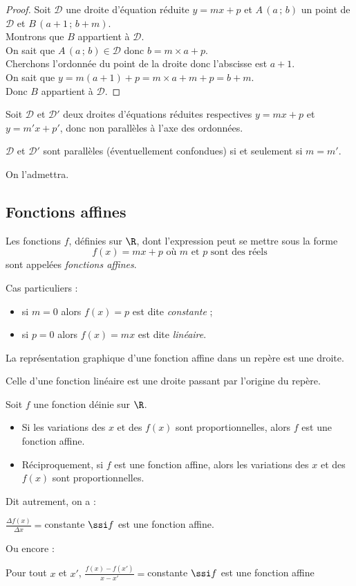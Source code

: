 \begin{proof}
Soit $\mathcal{D}$ une droite d'équation réduite $y=mx+p$ et $A\,(a\,;\,b)$ un point de $\mathcal{D}$ et $B\,(a+1\,;\,b+m)$.\\
Montrons que $B$ appartient à $\mathcal{D}$.\\
On sait que $A\,(a\,;\,b)\in\mathcal{D}$ donc $b=m\times a + p$.\\
Cherchons l'ordonn\'ee du point de la droite donc l'abscisse est $a+1$.\\
On sait que $y=m(a+1)+p=m\times a + m + p = b+m$.\\
Donc $B$ appartient à $\mathcal{D}$.
\end{proof}
\begin{prop}
Soit $\mathcal{D}$ et $\mathcal{D}'$ deux droites d'équations réduites respectives $y=mx+p$ et $y=m'x+p'$, donc non parallèles à l'axe des ordonnées.

$\mathcal{D}$ et $\mathcal{D}'$ sont parallèles (éventuellement confondues) si et seulement si $m=m'$.
\end{prop}

On l'admettra.

\subsection{Fonctions affines}
\begin{definition}
Les fonctions $f$, définies sur $\R$, dont l'expression peut se mettre sous la forme \[f(x)=mx+p \text{ où $m$ et $p$ sont des réels}\] sont appelées \emph{fonctions affines}.

Cas particuliers :
\begin{itemize}
	\item si $m=0$ alors $f(x)=p$ est dite \emph{constante} ;
	\item si $p=0$ alors $f(x)=mx$ est dite \emph{linéaire}.
\end{itemize}
\end{definition}

\begin{prop}
La représentation graphique d'une fonction affine dans un repère est une droite.

Celle d'une fonction linéaire est une droite passant par l'origine du repère.
\end{prop}

\begin{prop}
Soit $f$ une fonction déinie sur $\R$.
\begin{itemize}
	\item Si les variations des $x$ et des $f(x)$ sont proportionnelles, alors $f$ est une fonction affine.
	\item Réciproquement, si $f$ est une fonction affine, alors les variations des $x$ et des $f(x)$ sont proportionnelles.
\end{itemize}
Dit autrement, on a :

$\frac{\Delta f(x)}{\Delta x}=$constante $\ssi f$ est une fonction affine.

Ou encore :

Pour tout $x$ et $x'$, $\frac{f(x)-f(x')}{x-x'}=$constante $\ssi f$ est une fonction affine
\end{prop}

